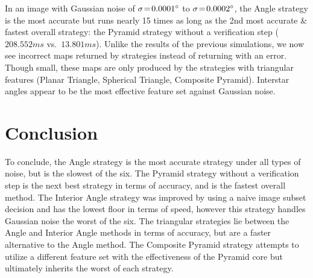 In an image with Gaussian noise of $\sigma \!=\! 0.0001^\circ$ to $\sigma \!=\! 0.0002^\circ$, the Angle strategy is the most accurate but runs nearly 15 times as long as the 2nd most accurate \& fastest overall strategy: the Pyramid strategy without a verification step ($208.552\si{ms}$ vs.\ $13.801\si{ms}$).
Unlike the results of the previous simulations, we now see incorrect maps returned by strategies instead of returning with an error.
Though small, these maps are only produced by the strategies with triangular features (Planar Triangle, Spherical Triangle, Composite Pyramid).
Interstar angles appear to be the most effective feature set against Gaussian noise.

\section{Conclusion}\label{sec:conclusion}
To conclude, the Angle strategy is the most accurate strategy under all types of noise, but is the slowest of the six.
The Pyramid strategy without a verification step is the next best strategy in terms of accuracy, and is the fastest overall method.
The Interior Angle strategy was improved by using a naive image subset decision and has the lowest floor in terms of speed, however this strategy handles Gaussian noise the worst of the six. 
The triangular strategies lie between the Angle and Interior Angle methods in terms of accuracy, but are a faster alternative to the Angle method.
The Composite Pyramid strategy attempts to utilize a different feature set with the effectiveness of the Pyramid core but ultimately inherits the worst of each strategy.

\begin{figure}
\end{figure}


